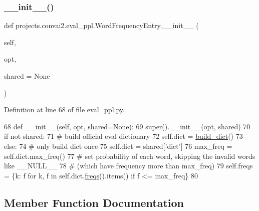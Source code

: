 \subsubsection{\texorpdfstring{\+\_\+\+\_\+init\+\_\+\+\_\+()}{\_\_init\_\_()}}
{\footnotesize\ttfamily def projects.\+convai2.\+eval\+\_\+ppl.\+Word\+Frequency\+Entry.\+\_\+\+\_\+init\+\_\+\+\_\+ (\begin{DoxyParamCaption}\item[{}]{self,  }\item[{}]{opt,  }\item[{}]{shared = {\ttfamily None} }\end{DoxyParamCaption})}



Definition at line 68 of file eval\+\_\+ppl.\+py.


\begin{DoxyCode}
68     \textcolor{keyword}{def }\_\_init\_\_(self, opt, shared=None):
69         super().\_\_init\_\_(opt, shared)
70         \textcolor{keywordflow}{if} \textcolor{keywordflow}{not} shared:
71             \textcolor{comment}{# build official eval dictionary}
72             self.dict = \hyperlink{namespacebuild__dict}{build\_dict}()
73         \textcolor{keywordflow}{else}:
74             \textcolor{comment}{# only build dict once}
75             self.dict = shared[\textcolor{stringliteral}{'dict'}]
76         max\_freq = self.dict.max\_freq()
77         \textcolor{comment}{# set probability of each word, skipping the invalid words like \_\_NULL\_\_}
78         \textcolor{comment}{# (which have frequency more than max\_freq)}
79         self.freqs = \{k: f \textcolor{keywordflow}{for} k, f \textcolor{keywordflow}{in} self.dict.\hyperlink{namespaceparlai_1_1agents_1_1tfidf__retriever_1_1build__tfidf_a82fd1621e57caaa8ff7a9c27b0e94125}{freqs}().items() \textcolor{keywordflow}{if} f <= max\_freq\}
80 
\end{DoxyCode}


\subsection{Member Function Documentation}
\mbox{\label{classprojects_1_1convai2_1_1eval__ppl_1_1WordFrequencyEntry_abc7d4ea01f82e42e8a18794e620de005}} 
